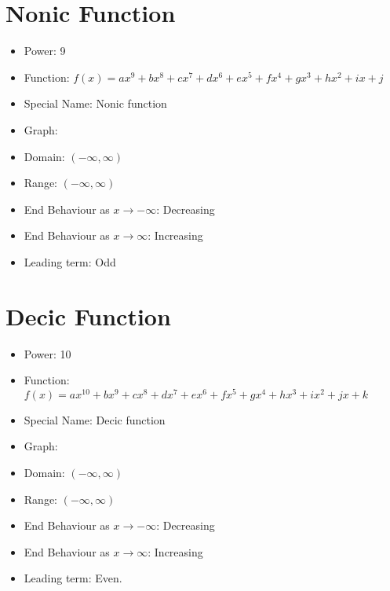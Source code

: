 \documentclass{article}
\begin{document}
\section*{Nonic Function}

\begin{itemize}
    \item Power: 9
    \item Function: $f(x) = ax^9 + bx^8 + cx^7 + dx^6 + ex^5 + fx^4 + gx^3 + hx^2 + ix + j$
    \item Special Name: Nonic function
    \item Graph:
    
    
    \item Domain: $(-\infty, \infty)$
    \item Range: $(-\infty, \infty)$
    \item End Behaviour as $x \rightarrow -\infty$: Decreasing
    \item End Behaviour as $x \rightarrow \infty$: Increasing
    \item Leading term: Odd
\end{itemize}
\newpage 

\section*{Decic Function}

\begin{itemize}
    \item Power: 10
    \item Function: $f(x) = ax^{10} + bx^9 + cx^8 + dx^7 + ex^6 + fx^5 + gx^4 + hx^3 + ix^2 + jx + k$
    \item Special Name: Decic function
    \item Graph:
    

    \item Domain: $(-\infty, \infty)$
    \item Range: $(-\infty, \infty)$
    \item End Behaviour as $x \rightarrow -\infty$: Decreasing
    \item End Behaviour as $x \rightarrow \infty$: Increasing
    \item Leading term: Even.
\end{itemize}
\end{document}
